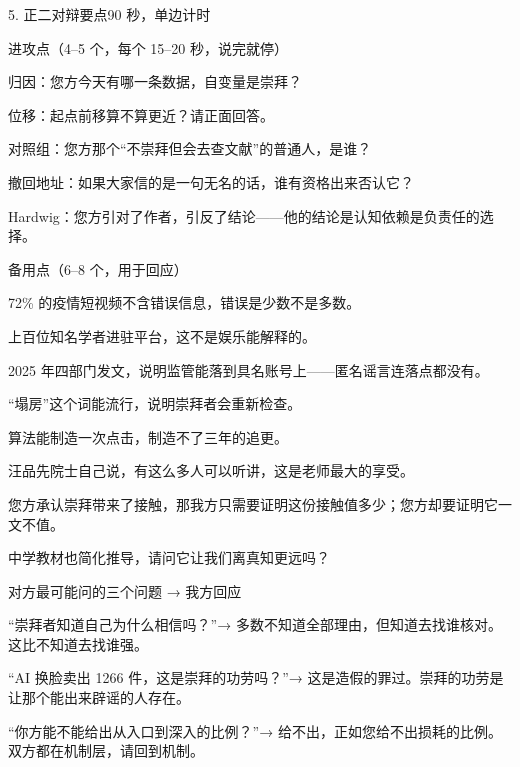 \documentclass[script,pro]{debate}
\begin{document}
\begin{stage}{5. 正二对辩要点}{90 秒，单边计时}
\begin{points}{进攻点（4–5 个，每个 15–20 秒，说完就停）}
\item 归因：您方今天有哪一条数据，自变量是崇拜？
\item 位移：起点前移算不算更近？请正面回答。
\item 对照组：您方那个“不崇拜但会去查文献”的普通人，是谁？
\item 撤回地址：如果大家信的是一句无名的话，谁有资格出来否认它？
\item Hardwig：您方引对了作者，引反了结论——他的结论是认知依赖是负责任的选择。
\end{points}
\begin{points}{备用点（6–8 个，用于回应）}
\item 72\% 的疫情短视频不含错误信息，错误是少数不是多数。
\item 上百位知名学者进驻平台，这不是娱乐能解释的。
\item 2025 年四部门发文，说明监管能落到具名账号上——匿名谣言连落点都没有。
\item “塌房”这个词能流行，说明崇拜者会重新检查。
\item 算法能制造一次点击，制造不了三年的追更。
\item 汪品先院士自己说，有这么多人可以听讲，这是老师最大的享受。
\item 您方承认崇拜带来了接触，那我方只需要证明这份接触值多少；您方却要证明它一文不值。
\item 中学教材也简化推导，请问它让我们离真知更远吗？
\end{points}
\begin{points}{对方最可能问的三个问题 → 我方回应}
\item “崇拜者知道自己为什么相信吗？”→ 多数不知道全部理由，但知道去找谁核对。这比不知道去找谁强。
\item “AI 换脸卖出 1266 件，这是崇拜的功劳吗？”→ 这是造假的罪过。崇拜的功劳是让那个能出来辟谣的人存在。
\item “你方能不能给出从入口到深入的比例？”→ 给不出，正如您给不出损耗的比例。双方都在机制层，请回到机制。
\end{points}
\end{stage}
\end{document}
